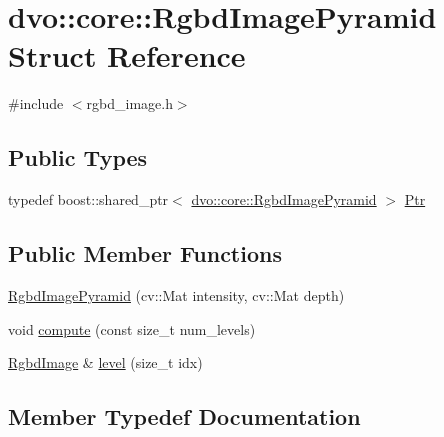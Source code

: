 \hypertarget{structdvo_1_1core_1_1_rgbd_image_pyramid}{}\section{dvo\+:\+:core\+:\+:Rgbd\+Image\+Pyramid Struct Reference}
\label{structdvo_1_1core_1_1_rgbd_image_pyramid}


{\ttfamily \#include $<$rgbd\+\_\+image.\+h$>$}

\subsection*{Public Types}
\begin{DoxyCompactItemize}
\item 
typedef boost\+::shared\+\_\+ptr$<$ \mbox{\hyperlink{structdvo_1_1core_1_1_rgbd_image_pyramid}{dvo\+::core\+::\+Rgbd\+Image\+Pyramid}} $>$ \mbox{\hyperlink{structdvo_1_1core_1_1_rgbd_image_pyramid_a9033ebd4631ed39f36710700092edb26}{Ptr}}
\end{DoxyCompactItemize}
\subsection*{Public Member Functions}
\begin{DoxyCompactItemize}
\item 
\mbox{\hyperlink{structdvo_1_1core_1_1_rgbd_image_pyramid_af26d5ad8785d1e7747eaec7e247484f9}{Rgbd\+Image\+Pyramid}} (cv\+::\+Mat intensity, cv\+::\+Mat depth)
\item 
void \mbox{\hyperlink{structdvo_1_1core_1_1_rgbd_image_pyramid_a082e8b87a9a6f87ebbe774c957374127}{compute}} (const size\+\_\+t num\+\_\+levels)
\item 
\mbox{\hyperlink{structdvo_1_1core_1_1_rgbd_image}{Rgbd\+Image}} \& \mbox{\hyperlink{structdvo_1_1core_1_1_rgbd_image_pyramid_a50961fbcb3f7402e0427de8649b145e8}{level}} (size\+\_\+t idx)
\end{DoxyCompactItemize}


\subsection{Member Typedef Documentation}
\mbox{\label{structdvo_1_1core_1_1_rgbd_image_pyramid_a9033ebd4631ed39f36710700092edb26}} 
